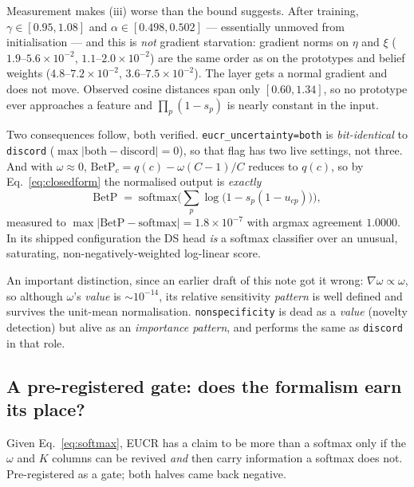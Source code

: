 \documentclass{article}
\begin{document}
Measurement makes (iii) worse than the bound suggests. After training,
$\gamma \in [0.95, 1.08]$ and $\alpha \in [0.498, 0.502]$ --- essentially
unmoved from initialisation --- and this is \emph{not} gradient starvation:
gradient norms on $\eta$ and $\xi$ ($1.9$--$5.6\times10^{-2}$,
$1.1$--$2.0\times10^{-2}$) are the same order as on the prototypes and belief
weights ($4.8$--$7.2\times10^{-2}$, $3.6$--$7.5\times10^{-2}$). The layer gets a
normal gradient and does not move. Observed cosine distances span only
$[0.60, 1.34]$, so no prototype ever approaches a feature and
$\prod_p(1-s_p)$ is nearly constant in the input.

Two consequences follow, both verified. \texttt{eucr\_uncertainty=both} is
\emph{bit-identical} to \texttt{discord} ($\max|\text{both}-\text{discord}| = 0$),
so that flag has two live settings, not three. And with $\omega\approx0$,
$\mathrm{BetP}_c = q(c) - \omega(C{-}1)/C$ reduces to $q(c)$, so by
Eq.~\eqref{eq:closedform} the normalised output is \emph{exactly}
\begin{equation}
\mathrm{BetP} \;=\; \mathrm{softmax}\Big(\textstyle\sum_p \log\big(1 - s_p(1-u_{cp})\big)\Big),
\label{eq:softmax}
\end{equation}
measured to $\max|\mathrm{BetP}-\mathrm{softmax}| = 1.8\times10^{-7}$ with argmax
agreement $1.0000$. In its shipped configuration the DS head \emph{is} a softmax
classifier over an unusual, saturating, non-negatively-weighted log-linear score.

An important distinction, since an earlier draft of this note got it wrong:
$\nabla\omega \propto \omega$, so although $\omega$'s \emph{value} is
$\sim10^{-14}$, its relative sensitivity \emph{pattern} is well defined and
survives the unit-mean normalisation. \texttt{nonspecificity} is dead as a
\emph{value} (novelty detection) but alive as an \emph{importance pattern}, and
performs the same as \texttt{discord} in that role.

\subsection{A pre-registered gate: does the formalism earn its place?}
\label{sec:gate}

Given Eq.~\eqref{eq:softmax}, EUCR has a claim to be more than a softmax only if
the $\omega$ and $K$ columns can be revived \emph{and} then carry information a
softmax does not. Pre-registered as a gate; both halves came back negative.
\end{document}
